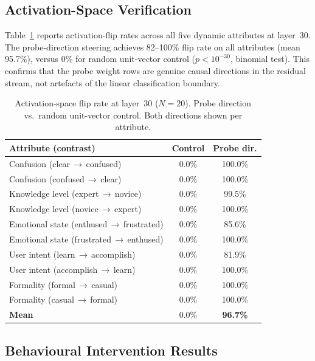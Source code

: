 \documentclass[11pt]{article}
\begin{document}
\subsection{Activation-Space Verification}

Table~\ref{tab:probe_score} reports activation-flip rates across all five
dynamic attributes at layer~30.  The probe-direction steering achieves
82--100\% flip rate on all attributes (mean 95.7\%), versus 0\% for random
unit-vector control ($p < 10^{-30}$, binomial test).  This confirms that the
probe weight rows are genuine causal directions in the residual stream, not
artefacts of the linear classification boundary.

\begin{table}[h]
\centering
\small
\caption{Activation-space flip rate at layer~30 ($N{=}20$). Probe direction
         vs.\ random unit-vector control. Both directions shown per attribute.}
\label{tab:probe_score}
\begin{tabular}{lcc}
\toprule
\textbf{Attribute (contrast)} & \textbf{Control} & \textbf{Probe dir.} \\
\midrule
Confusion (clear\,$\to$\,confused)           & 0.0\% & 100.0\% \\
Confusion (confused\,$\to$\,clear)           & 0.0\% & 100.0\% \\
Knowledge level (expert\,$\to$\,novice)      & 0.0\% &  99.5\% \\
Knowledge level (novice\,$\to$\,expert)      & 0.0\% & 100.0\% \\
Emotional state (enthused\,$\to$\,frustrated)& 0.0\% &  85.6\% \\
Emotional state (frustrated\,$\to$\,enthused)& 0.0\% & 100.0\% \\
User intent (learn\,$\to$\,accomplish)       & 0.0\% &  81.9\% \\
User intent (accomplish\,$\to$\,learn)       & 0.0\% & 100.0\% \\
Formality (formal\,$\to$\,casual)            & 0.0\% & 100.0\% \\
Formality (casual\,$\to$\,formal)            & 0.0\% & 100.0\% \\
\midrule
\textbf{Mean}                                & 0.0\% &  \textbf{96.7\%} \\
\bottomrule
\end{tabular}
\end{table}

\subsection{Behavioural Intervention Results}
\end{document}

